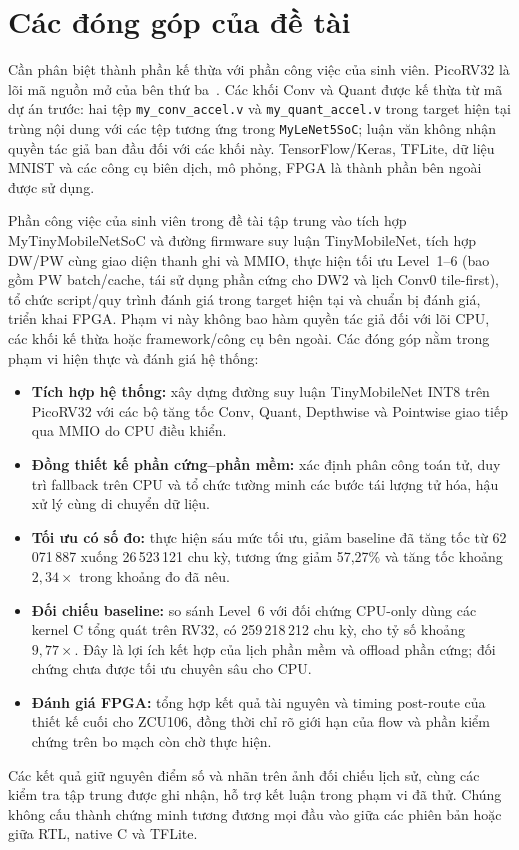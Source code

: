 \section{Các đóng góp của đề tài}
Cần phân biệt thành phần kế thừa với phần công việc của sinh viên. PicoRV32 là lõi mã nguồn mở của bên thứ ba~\cite{YosysHQ2024}. Các khối Conv và Quant được kế thừa từ mã dự án trước: hai tệp \texttt{my\_conv\_accel.v} và \texttt{my\_quant\_accel.v} trong target hiện tại trùng nội dung với các tệp tương ứng trong \texttt{MyLeNet5SoC}; luận văn không nhận quyền tác giả ban đầu đối với các khối này. TensorFlow/Keras, TFLite, dữ liệu MNIST và các công cụ biên dịch, mô phỏng, FPGA là thành phần bên ngoài được sử dụng.

Phần công việc của sinh viên trong đề tài tập trung vào tích hợp MyTinyMobileNetSoC và đường firmware suy luận TinyMobileNet, tích hợp DW/PW cùng giao diện thanh ghi và MMIO, thực hiện tối ưu Level~1--6 (bao gồm PW batch/cache, tái sử dụng phần cứng cho DW2 và lịch Conv0 tile-first), tổ chức script/quy trình đánh giá trong target hiện tại và chuẩn bị đánh giá, triển khai FPGA. Phạm vi này không bao hàm quyền tác giả đối với lõi CPU, các khối kế thừa hoặc framework/công cụ bên ngoài. Các đóng góp nằm trong phạm vi hiện thực và đánh giá hệ thống:
\begin{itemize}
    \item \textbf{Tích hợp hệ thống:} xây dựng đường suy luận TinyMobileNet INT8 trên PicoRV32 với các bộ tăng tốc Conv, Quant, Depthwise và Pointwise giao tiếp qua MMIO do CPU điều khiển.
    \item \textbf{Đồng thiết kế phần cứng--phần mềm:} xác định phân công toán tử, duy trì fallback trên CPU và tổ chức tường minh các bước tái lượng tử hóa, hậu xử lý cùng di chuyển dữ liệu.
    \item \textbf{Tối ưu có số đo:} thực hiện sáu mức tối ưu, giảm baseline đã tăng tốc từ 62\,071\,887 xuống 26\,523\,121 chu kỳ, tương ứng giảm 57,27\% và tăng tốc khoảng $2{,}34\times$ trong khoảng đo đã nêu.
    \item \textbf{Đối chiếu baseline:} so sánh Level~6 với đối chứng CPU-only dùng các kernel C tổng quát trên RV32, có 259\,218\,212 chu kỳ, cho tỷ số khoảng $9{,}77\times$. Đây là lợi ích kết hợp của lịch phần mềm và offload phần cứng; đối chứng chưa được tối ưu chuyên sâu cho CPU.
    \item \textbf{Đánh giá FPGA:} tổng hợp kết quả tài nguyên và timing post-route của thiết kế cuối cho ZCU106, đồng thời chỉ rõ giới hạn của flow và phần kiểm chứng trên bo mạch còn chờ thực hiện.
\end{itemize}
Các kết quả giữ nguyên điểm số và nhãn trên ảnh đối chiếu lịch sử, cùng các kiểm tra tập trung được ghi nhận, hỗ trợ kết luận trong phạm vi đã thử. Chúng không cấu thành chứng minh tương đương mọi đầu vào giữa các phiên bản hoặc giữa RTL, native C và TFLite.

